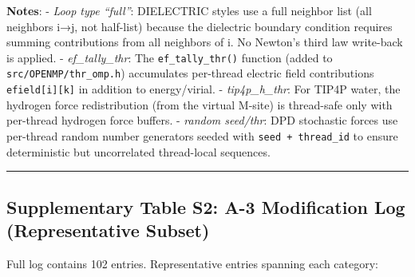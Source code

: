 \documentclass[
  11pt,
]{article}
\begin{document}
\textbf{Notes}: - \emph{Loop type ``full''}: DIELECTRIC styles use a
full neighbor list (all neighbors i→j, not half-list) because the
dielectric boundary condition requires summing contributions from all
neighbors of i. No Newton's third law write-back is applied. -
\emph{ef\_tally\_thr}: The \texttt{ef\_tally\_thr()} function (added to
\texttt{src/OPENMP/thr\_omp.h}) accumulates per-thread electric field
contributions \texttt{efield{[}i{]}{[}k{]}} in addition to
energy/virial. - \emph{tip4p\_h\_thr}: For TIP4P water, the hydrogen
force redistribution (from the virtual M-site) is thread-safe only with
per-thread hydrogen force buffers. - \emph{random seed/thr}: DPD
stochastic forces use per-thread random number generators seeded with
\texttt{seed\ +\ thread\_id} to ensure deterministic but uncorrelated
thread-local sequences.

\begin{center}\rule{0.5\linewidth}{0.5pt}\end{center}

\subsection{Supplementary Table S2: A-3 Modification Log (Representative
Subset)}\label{supplementary-table-s2-a-3-modification-log-representative-subset}

Full log contains 102 entries. Representative entries spanning each
category:
\end{document}
